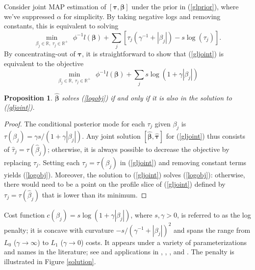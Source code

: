 \documentclass[12pt]{article}
\newtheorem{prop}{\sc Proposition}[section]
\newcommand{\bs}[1]{\boldsymbol{#1}}
\newcommand{\ds}[1]{\mathds{#1}}
\begin{document}
Consider joint MAP estimation of $[\bs{\tau},\bs{\beta}]$ under the prior in
   (\ref{glprior}), where we've suppressed $\alpha$ for simplicity. By taking
   negative logs and removing constants, this is equivalent to solving
\begin{equation}\label{gljoint}
\min_{\beta_j\in\ds{R},~\tau_j \in \ds{R}^{+}}~~
\phi^{-1}l(\bs{\beta}) + \sum_j \left[\tau_j(\gamma^{-1}+|\beta_j|) - s\log(\tau_j)\right].
\end{equation}
By concentrating-out of $\bs{\tau}$, it is straightforward to show that (\ref{gljoint}) is equivalent 
to the objective 
\begin{equation}\label{logobj}
\min_{\beta_j\in\ds{R},~\tau_j \in \ds{R}^{+}}~~
\phi^{-1}l(\bs{\beta}) + \sum_j  s\log(1+\gamma|\beta_j|)
\end{equation}

\begin{prop}\label{penprop}
  $\bs{\hat\beta}$ solves (\ref{logobj}) if and only if it is also in
  the solution to (\ref{gljoint}).
\end{prop}
\begin{proof}
  The conditional posterior mode for each $\tau_j$ given $\beta_j$
  is $\tau(\beta_j) = \gamma s/(1 + \gamma|\beta_j|)$.  Any joint solution
  $[\bs{\hat\beta},\bs{\hat\tau}]$ for (\ref{gljoint}) thus
  consists of $\hat{\tau}_{j} = \tau(\hat\beta_{j})$;
  otherwise, it is always possible to decrease the objective by
  replacing $\hat\tau_{j}$. Setting each $\tau_j = 
  \tau(\beta_j)$ in (\ref{gljoint}) and removing constant terms yields
  (\ref{logobj}).  Moreover, the solution to (\ref{gljoint}) solves
  (\ref{logobj}): otherwise, there would need to be a point on the
  profile slice of (\ref{gljoint}) defined by $\tau_{j} =
  \tau(\hat\beta_{j})$ that is lower than its minimum.
\end{proof}

Cost function  $c(\beta_j) = s\log(1+\gamma|\beta_j|)$, where $s,\gamma>0$, is
referred to as the log penalty; it is concave with curvature
$-s/(\gamma^{-1}+|\beta_j|)^2$ and spans the range from $L_0$
($\gamma\rightarrow \infty$) to $L_1$ ($\gamma\rightarrow 0$) costs.  It
appears under a variety of parameterizations and names in the literature; see
\citet{mazumder_sparsenet_2011} and applications in
\citet{friedman_fast_2008}, \citet{candes_enhancing_2008},
\citet{cevher_learning_2009}, \citet{taddy_multinomial_2013} and \citet{armagan_generalized_2013}. 
The penalty is illustrated in Figure \ref{solution}.
\end{document}
